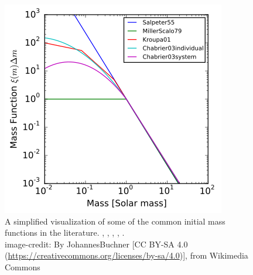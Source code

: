 \begin{figure}
  \centering
  \includegraphics[width=\textwidth]{img/Plot_of_various_initial_mass_functions.png}
  \caption{ \label{fig:imf}
    A simplified visualization of some of the common initial mass functions in the literature.
    , , , , . \\
    image-credit: By JohannesBuchner [CC BY-SA 4.0 (\url{https://creativecommons.org/licenses/by-sa/4.0})], from Wikimedia Commons
  }
\end{figure}
